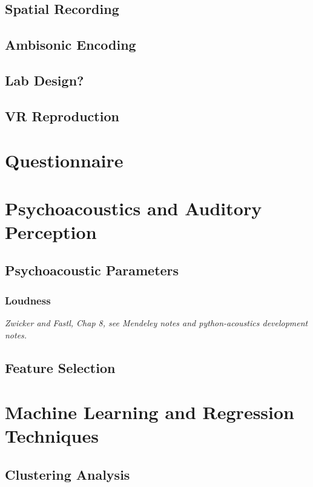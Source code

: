  \subsection{Spatial Recording}

 \subsection{Ambisonic Encoding}

 \subsection{Lab Design?}

 \subsection{VR Reproduction}

\section{Questionnaire}

\section{Psychoacoustics and Auditory Perception}

 \subsection{Psychoacoustic Parameters}

   \subsubsection{Loudness}
     \emph{Zwicker and Fastl, Chap 8, see Mendeley notes and python-acoustics development notes.}
 \subsection{Feature Selection}

\section{Machine Learning and Regression Techniques}

 \subsection{Clustering Analysis}

